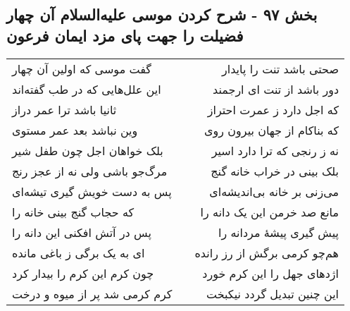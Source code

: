 \begin{center}
\section*{بخش ۹۷ - شرح کردن موسی علیه‌السلام آن  چهار فضیلت را جهت  پای مزد ایمان فرعون}
\label{sec:sh097}
\begin{longtable}{l p{0.5cm} r}
گفت موسی که اولین آن چهار
&&
صحتی باشد تنت را پایدار
\\
این علل‌هایی که در طب گفته‌اند
&&
دور باشد از تنت ای ارجمند
\\
ثانیا باشد ترا عمر دراز
&&
که اجل دارد ز عمرت احتراز
\\
وین نباشد بعد عمر مستوی
&&
که بناکام از جهان بیرون روی
\\
بلک خواهان اجل چون طفل شیر
&&
نه ز رنجی که ترا دارد اسیر
\\
مرگ‌جو باشی ولی نه از عجز رنج
&&
بلک بینی در خراب خانه گنج
\\
پس به دست خویش گیری تیشه‌ای
&&
می‌زنی بر خانه بی‌اندیشه‌ای
\\
که حجاب گنج بینی خانه را
&&
مانع صد خرمن این یک دانه را
\\
پس در آتش افکنی این دانه را
&&
پیش گیری پیشهٔ مردانه را
\\
ای به یک برگی ز باغی مانده
&&
هم‌چو کرمی برگش از رز رانده
\\
چون کرم این کرم را بیدار کرد
&&
اژدهای جهل را این کرم خورد
\\
کرم کرمی شد پر از میوه و درخت
&&
این چنین تبدیل گردد نیکبخت
\\
\end{longtable}
\end{center}
